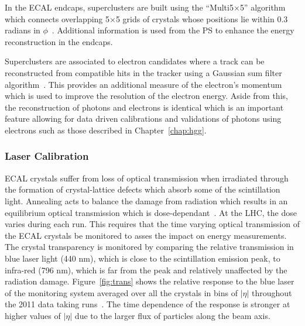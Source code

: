 In the ECAL endcaps, superclusters are built using the ``Multi5$\times$5'' algorithm which 
connects overlapping 5$\times$5 grids of crystals whose positions lie within 
0.3 radians in $\phi$~\citep{AN-09-164}. 
Additional information is used from the PS to enhance the energy reconstruction in the endcaps. 

Superclusters are associated to electron candidates 
where a track can be reconstructed from
compatible hits in the tracker using a Gaussian sum filter algorithm~\citep{GSF_Electron_Reconstruction_CMS}.  
This provides an additional measure of the electron's momentum which is used 
to improve the resolution of the electron energy.
Aside from this, the reconstruction of photons and electrons is identical which is an 
important feature allowing for data driven calibrations and validations of photons using 
electrons such as those described in Chapter~\ref{chap:hgg}.


\subsubsection{Laser Calibration}

ECAL crystals suffer from loss of optical transmission when irradiated through 
the formation of crystal-lattice defects which absorb some of the scintillation light. Annealing
acts to balance the damage from radiation which results in an equilibrium optical 
transmission which is dose-dependant~\citep{TDR1}. 
At the LHC, the dose varies during each run. This requires that the time varying optical transmission of the ECAL 
crystals be monitored to asses the impact on energy measurements.
The crystal transparency is monitored by comparing the relative transmission in blue laser light (440 nm), 
which is close to the scintillation emission peak, to infra-red (796 nm), which is far from the 
peak and relatively unaffected by the radiation damage.
Figure~\ref{fig:trans} shows the relative response to the blue laser of the monitoring system
averaged over all the crystals in bins of $|\eta|$ throughout the 2011 data taking 
runs~\citep{CMS-DP-2012-007}. 
The time dependence of the response is stronger at higher values of $|\eta|$ due to the larger flux
of particles along the beam axis.

